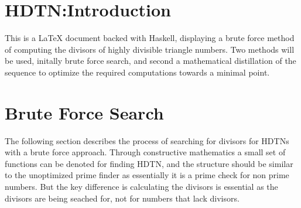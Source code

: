 \documentclass{article}
\begin{document}
\maketitle
\newpage
\section{HDTN:Introduction}
This is a LaTeX document backed with Haskell, displaying a brute
force method of computing the divisors of highly divisible triangle
numbers. Two methods will be used, initally brute force search,
and second a mathematical distillation of the sequence to optimize
the required computations towards a minimal point.
\section{Brute Force Search}
The following section describes the process of searching for divisors for HDTNs with a brute force approach. 
Through constructive mathematics a small set of functions can be denoted for finding HDTN, and the structure
should be similar to the unoptimized prime finder as essentially it is a prime check for non prime numbers.
But the key difference is calculating the divisors is essential as the divisors are being seached for,
not for numbers that lack divisors.
\end{document}

